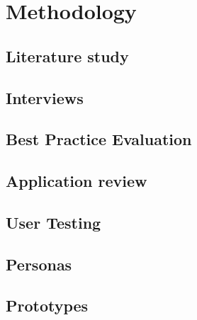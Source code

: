 \chapter{Methodology}

\section{Literature study}
%
\section{Interviews}
%
\section{Best Practice Evaluation}
%
\section{Application review}
%
\section{User Testing}
%
\section{Personas}
%
\section{Prototypes}
